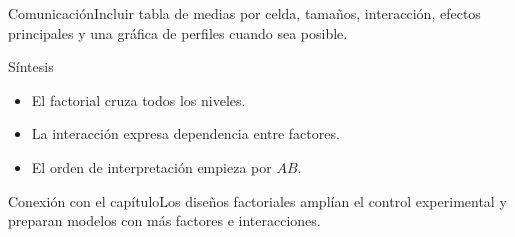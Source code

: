 \documentclass[10pt,aspectratio=169]{beamer}
\begin{document}
\begin{frame}{Comunicación}\small Incluir tabla de medias por celda, tamaños, interacción, efectos principales y una gráfica de perfiles cuando sea posible.\end{frame}
\begin{frame}{Síntesis}\small\begin{itemize}\item El factorial cruza todos los niveles.\item La interacción expresa dependencia entre factores.\item El orden de interpretación empieza por $AB$.\end{itemize}\end{frame}
\begin{frame}{Conexión con el capítulo}\small Los diseños factoriales amplían el control experimental y preparan modelos con más factores e interacciones.\end{frame}
\end{document}
